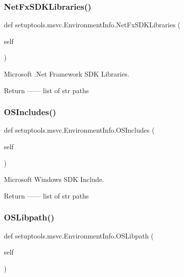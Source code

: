 \subsubsection{\texorpdfstring{Net\+Fx\+S\+D\+K\+Libraries()}{NetFxSDKLibraries()}}
{\footnotesize\ttfamily def setuptools.\+msvc.\+Environment\+Info.\+Net\+Fx\+S\+D\+K\+Libraries (\begin{DoxyParamCaption}\item[{}]{self }\end{DoxyParamCaption})}

\begin{DoxyVerb}Microsoft .Net Framework SDK Libraries.

Return
------
list of str
    paths
\end{DoxyVerb}
 \mbox{\label{classsetuptools_1_1msvc_1_1EnvironmentInfo_a5dd42b70389abbceecb4675fa4669cd7}} 
\subsubsection{\texorpdfstring{O\+S\+Includes()}{OSIncludes()}}
{\footnotesize\ttfamily def setuptools.\+msvc.\+Environment\+Info.\+O\+S\+Includes (\begin{DoxyParamCaption}\item[{}]{self }\end{DoxyParamCaption})}

\begin{DoxyVerb}Microsoft Windows SDK Include.

Return
------
list of str
    paths
\end{DoxyVerb}
 \mbox{\label{classsetuptools_1_1msvc_1_1EnvironmentInfo_ac0bfd6c2e533ac3db2b4fb30feb97349}} 
\subsubsection{\texorpdfstring{O\+S\+Libpath()}{OSLibpath()}}
{\footnotesize\ttfamily def setuptools.\+msvc.\+Environment\+Info.\+O\+S\+Libpath (\begin{DoxyParamCaption}\item[{}]{self }\end{DoxyParamCaption})}

